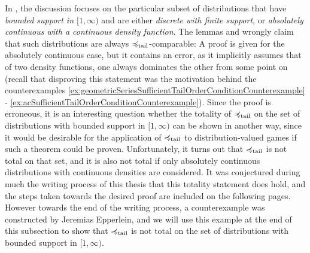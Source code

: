 \documentclass[a4paper]{scrreprt}
\theoremstyle{definition}
\begin{document}
    In \cite{bib:rassGameRiskManagI,bib:rassTotalOrderingOnLossDistributions}, the discussion focuses on the particular subset of distributions that have \emph{bounded support in $[1, \infty)$} and are either \emph{discrete with finite support}, or \emph{absolutely continuous with a continuous density function}.
    The lemmas \cite[Lemma 2]{bib:rassTotalOrderingOnLossDistributions} and \cite[Lemma 2.4]{bib:rassGameRiskManagI} wrongly claim that such distributions are always $\preccurlyeq_{\text{tail}}$-comparable: A proof is given for the absolutely continuous case, but it contains an error, as it implicitly assumes that of two density functions, one always dominates the other from some point on (recall that disproving this statement was the motivation behind the counterexamples \ref{ex:geometricSeriesSufficientTailOrderConditionCounterexample} - \ref{ex:acSufficientTailOrderConditionCounterexample}).
    Since the proof is erroneous, it is an interesting question whether the totality of $\preccurlyeq_{\text{tail}}$ on the set of distributions with bounded support in $[1, \infty)$ can be shown in another way, since it would be desirable for the application of $\preccurlyeq_{\text{tail}}$ to distribution-valued games if such a theorem could be proven.
    Unfortunately, it turns out that $\preccurlyeq_{\text{tail}}$ is not total on that set, and it is also not total if only absolutely continuous distributions with continuous densities are considered.
    It was conjectured during much the writing process of this thesis that this totality statement does hold, and the steps taken towards the desired proof are included on the following pages. However towards the end of the writing process, a counterexample was constructed by Jeremias Epperlein, and we will use this example at the end of this subsection to show that $\preccurlyeq_{\text{tail}}$ is not total on the set of distributions with bounded support in $[1, \infty)$.
    
\end{document}
